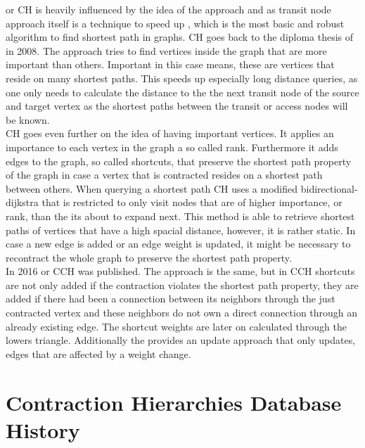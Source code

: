\cite[Contraction Hierarchies]{Geisberger_2012} or CH is heavily influenced by the idea of the \cite[Transit-Node]{Bast_2007} approach and as transit node approach itself is a
technique to speed up \cite[Dijkstras Algorithm]{Dijkstra_1959}, which is the most basic and robust algorithm to find shortest path in graphs. CH goes back to the diploma thesis of \cite[Geisberger]{Geisberger} in 2008. The \cite[Transit-Node]{Bast_2007} approach
tries to find vertices inside the graph that are more important than others. Important in this case means, these are vertices that reside on many shortest paths. This speeds up 
especially long distance queries, as one only needs to calculate the distance to the the next transit node of the source and target vertex as the shortest paths between 
the transit or access nodes will be known. \\ 
CH goes even further on the idea of having important vertices. It applies an importance to each vertex in the graph a so called rank. Furthermore it adds edges to the graph,
so called shortcuts, that preserve the shortest path property of the graph in case a vertex that is contracted resides on a shortest path between others. When querying a shortest
path CH uses a modified bidirectional-dijkstra that is restricted to only visit nodes that are of higher importance, or rank, than the its about to expand next.
This method is able to retrieve shortest paths of vertices that have a high spacial distance, however, it is rather static. In case a new edge is added or an edge weight is updated, 
it might be necessary to recontract the whole graph to preserve the shortest path property. \\
In 2016 \cite[Customization Contraction Hierarchies]{CCH} or CCH was published. The approach is the same, but in CCH shortcuts are not only added if the contraction violates the shortest path property,
they are added if there had been a connection between its neighbors through the just contracted vertex and these neighbors do not own a direct connection through an already existing edge.
The shortcut weights are later on calculated through the lowers triangle. Additionally the \cite[Customization Contraction Hierarchies]{CCH} provides an update approach that only updates,
edges that are affected by a weight change.

\section{Contraction Hierarchies Database History}\label{sec:related_work:database}

